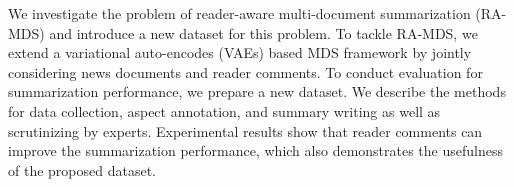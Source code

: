 We investigate the problem of reader-aware multi-document summarization (RA-MDS) and introduce a new dataset for this problem. To tackle RA-MDS, we extend a variational auto-encodes (VAEs) based MDS framework by jointly considering news documents and reader comments. To conduct evaluation for summarization performance, we prepare a new dataset. We describe the methods for data collection, aspect annotation, and summary writing as well as scrutinizing by experts. Experimental results show that reader comments can improve the summarization performance, which also demonstrates the usefulness of the proposed dataset.
